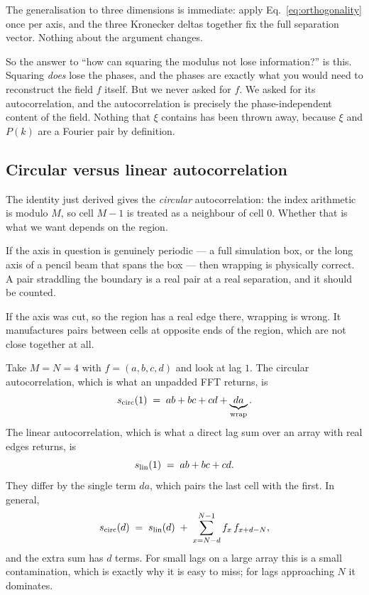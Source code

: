 \documentclass[12pt]{article}
\begin{document}
The generalisation to three dimensions is immediate: apply
Eq.~\eqref{eq:orthogonality} once per axis, and the three Kronecker deltas
together fix the full separation vector.  Nothing about the argument changes.

So the answer to ``how can squaring the modulus not lose information?'' is
this.  Squaring \emph{does} lose the phases, and the phases are exactly what
you would need to reconstruct the field $f$ itself.  But we never asked for
$f$.  We asked for its autocorrelation, and the autocorrelation is precisely
the phase-independent content of the field.  Nothing that $\xi$ contains has
been thrown away, because $\xi$ and $P(k)$ are a Fourier pair by definition.

\subsection{Circular versus linear autocorrelation}\label{sec:wraparound}

The identity just derived gives the \emph{circular} autocorrelation: the
index arithmetic is modulo $M$, so cell $M-1$ is treated as a neighbour of
cell $0$.  Whether that is what we want depends on the region.

If the axis in question is genuinely periodic --- a full simulation box, or
the long axis of a pencil beam that spans the box --- then wrapping is
physically correct.  A pair straddling the boundary is a real pair at a real
separation, and it should be counted.

If the axis was cut, so the region has a real edge there, wrapping is wrong.
It manufactures pairs between cells at opposite ends of the region, which are
not close together at all.

Take $M = N = 4$ with $f = (a,b,c,d)$ and look at lag $1$.  The circular
autocorrelation, which is what an unpadded FFT returns, is
\begin{equation}\label{eq:circ-example}
  s_{\rm circ}(1) \;=\; ab + bc + cd + \underbrace{da}_{\text{wrap}} .
\end{equation}
The linear autocorrelation, which is what a direct lag sum over an array with
real edges returns, is
\begin{equation}\label{eq:lin-example}
  s_{\rm lin}(1) \;=\; ab + bc + cd .
\end{equation}
They differ by the single term $da$, which pairs the last cell with the
first.  In general,
\begin{equation}\label{eq:circ-vs-lin}
  s_{\rm circ}(d) \;=\; s_{\rm lin}(d)
  \;+\; \sum_{x=N-d}^{N-1} f_x\, f_{x+d-N} ,
\end{equation}
and the extra sum has $d$ terms.  For small lags on a large array this is a
small contamination, which is exactly why it is easy to miss; for lags
approaching $N$ it dominates.
\end{document}

